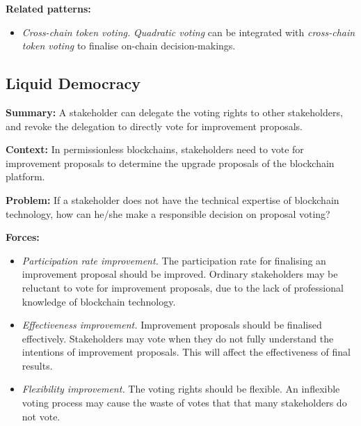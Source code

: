 \documentclass{article}
\begin{document}
\vspace{0.5em}\noindent \textbf{Related patterns:} 

\begin{itemize}
    \item \textit{Cross-chain token voting.} \textit{Quadratic voting} can be integrated with \textit{cross-chain token voting} to finalise on-chain decision-makings.
\end{itemize}


\subsection{Liquid Democracy}

\vspace{0.5em}\noindent \textbf{Summary:} A stakeholder can delegate the voting rights to other stakeholders, and revoke the delegation to directly vote for improvement proposals.

\vspace{0.5em}\noindent \textbf{Context:} In permissionless blockchains, stakeholders need to vote for improvement proposals to determine the upgrade proposals of the blockchain platform.

\vspace{0.5em}\noindent \textbf{Problem:} If a stakeholder does not have the technical expertise of blockchain technology, how can he/she make a responsible decision on proposal voting?

\vspace{0.5em}\noindent \textbf{Forces:} 

\begin{itemize}
  \item \textit{Participation rate improvement.} The participation rate for finalising an improvement proposal should be improved. Ordinary stakeholders may be reluctant to vote for improvement proposals, due to the lack of professional knowledge of blockchain technology.

  
  \item \textit{Effectiveness improvement.} Improvement proposals should be finalised effectively. Stakeholders may vote when they do not fully understand the intentions of improvement proposals. This will affect the effectiveness of final results.

  
  \item \textit{Flexibility improvement.} The voting rights should be flexible. An inflexible voting process may cause the waste of votes that that many stakeholders do not vote.
\end{itemize}
\end{document}
